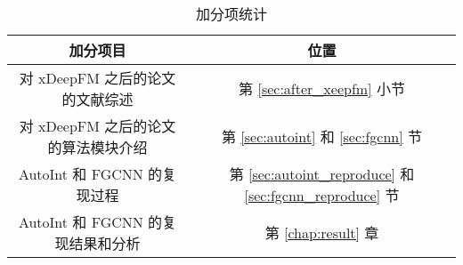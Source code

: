 \documentclass[degree=master,cjk-font=noto]{thuthesis}
\begin{document}
\begin{table}[htb]
  \centering
  \caption{加分项统计}
  \label{tab:time_complex}
  \begin{tabular}{cc}
    \toprule
    \textbf{加分项目}         & \textbf{位置}  \\
    \midrule
    对 xDeepFM 之后的论文的文献综述 & 第 \ref{sec:after_xeepfm} 小节 \\
    对 xDeepFM 之后的论文的算法模块介绍           & 第 \ref{sec:autoint} 和 \ref{sec:fgcnn} 节 \\
    AutoInt 和 FGCNN 的复现过程        & 第 \ref{sec:autoint_reproduce} 和 \ref{sec:fgcnn_reproduce} 节 \\
    AutoInt 和 FGCNN 的复现结果和分析 & 第 \ref{chap:result} 章 \\
    \bottomrule
  \end{tabular}
\end{table}

\backmatter


\appendix
\end{document}
